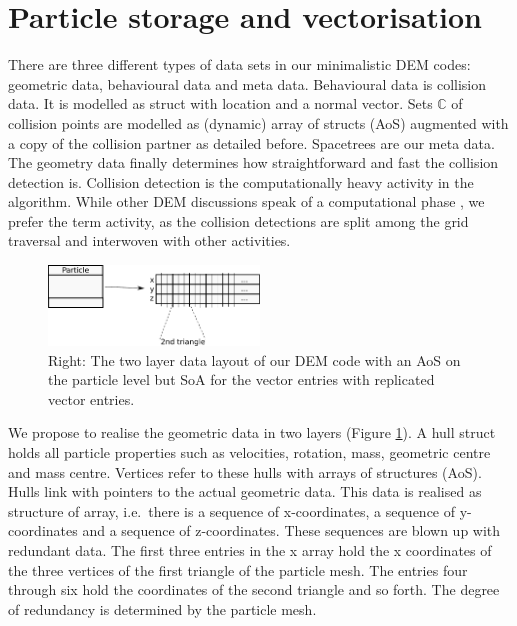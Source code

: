 \clearpage
\section{Particle storage and vectorisation}
\label{section:vectorisation}

There are three different types of data sets in our minimalistic DEM codes: 
geometric data, behavioural data and meta data. 
Behavioural data is collision data.
It is modelled as struct with location and a normal vector.
Sets $\mathbb{C}$ of collision points are modelled as (dynamic) array of structs
(AoS) augmented with a copy of the collision partner as detailed before.
Spacetrees are our meta data.
The geometry data finally determines how straightforward and fast the collision
detection is. Collision detection is the computationally heavy activity in the
algorithm.
While other DEM discussions speak of a computational phase \cite{Wachs2012, Wachs2012a, Rycroft2012, Parteli2013}, we
prefer the term activity, as the collision detections are split among the grid traversal
and interwoven with other activities.

\begin{figure}
 \begin{center}
  \includegraphics[width=0.5\textwidth]{sketches/data-structure.pdf}
 \end{center}
 \caption{
   Right: The two layer data layout of our DEM code with an AoS on the particle
   level but SoA for the vector entries with replicated vector entries.
 }
 \label{figure:data-structure}
\end{figure}

We propose to realise the geometric data in two layers (Figure
\ref{figure:data-structure}).
A hull struct holds all particle properties such as velocities, rotation, mass,
geometric centre and mass centre.
Vertices refer to these hulls with arrays of structures (AoS).
Hulls link with pointers to the actual geometric data. 
This data is realised as structure of array, i.e.~there is a sequence of
x-coordinates, a sequence of y-coordinates and a sequence of z-coordinates.
These sequences are blown up with redundant data.
The first three entries in the x array hold the x coordinates of the three
vertices of the first triangle of the particle mesh.
The entries four through six hold the coordinates of the second triangle and so
forth. 
The degree of redundancy is determined by the particle mesh.

